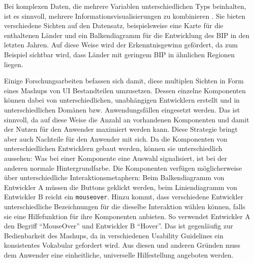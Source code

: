 \documentclass[
	headsepline,
	footsepline,
	fontsize=12pt,
	bibliography=totoc
]{scrbook}
\begin{document}

Bei komplexen Daten, die mehrere Variablen unterschiedlichen Typs beinhalten, ist es sinnvoll, mehrere Informationsvisualisierungen zu kombinieren \cite{Roberts2007, Pham2013, Waser2013}. Sie bieten verschiedene Sichten auf den Datensatz, beispielsweise eine Karte für die enthaltenen Länder und ein Balkendiagramm für die Entwicklung des BIP in den letzten Jahren. Auf diese Weise wird der Erkenntnisgewinn gefördert, da zum Beispiel sichtbar wird, dass Länder mit geringem BIP in ähnlichen Regionen liegen.


Einige Forschungsarbeiten \cite{Cappiello2011, Pietschmann2012, Chudnovskyy2012} befassen sich damit, diese multiplen Sichten in Form eines Mashups von UI Bestandteilen umzusetzen. Dessen einzelne Komponenten können dabei von unterschiedlichen, unabhängigen Entwicklern erstellt und in unterschiedlichen Domänen bzw. Anwendungsfällen eingesetzt werden. Das ist sinnvoll, da auf diese Weise die Anzahl an vorhandenen Komponenten und damit der Nutzen für den Anwender maximiert werden kann. Diese Strategie bringt aber auch Nachteile für den Anwender mit sich. Da die Komponenten von unterschiedlichen Entwicklern gebaut werden, können sie unterschiedlich aussehen: Was bei einer Komponente eine Auswahl signalisiert, ist bei der anderen normale Hintergrundfarbe. Die Komponenten verfügen möglicherweise über unterschiedliche Interaktionsmetaphern: Beim Balkendiagramm von Entwickler A müssen die Buttons geklickt werden, beim Liniendiagramm von Entwickler B reicht ein \texttt{mouseover}. Hinzu kommt, dass verschiedene Entwickler unterschiedliche Bezeichnungen für die dieselbe Interaktion wählen können, falls sie eine Hilfefunktion für ihre Komponenten anbieten. So verwendet Entwickler A den Begriff \enquote{MouseOver} und Entwickler B \enquote{Hover}. Das ist gegenläufig zur Bedienbarkeit des Mashups, da in verschiedenen Usability Guidelines ein konsistentes Vokabular gefordert wird. Aus diesen und anderen Gründen muss dem Anwender eine einheitliche, universelle Hilfestellung angeboten werden.

\end{document}
